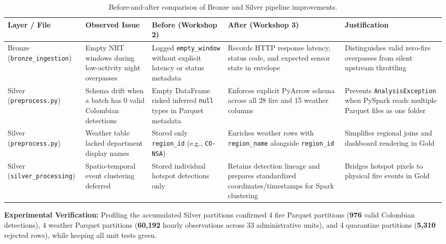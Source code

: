 \documentclass[11pt,letterpaper]{article}
\begin{document}
\begin{table}[H]
  \centering
  \footnotesize
  \setlength{\tabcolsep}{4pt}
  \begin{tabularx}{\textwidth}{>{\raggedright\arraybackslash}p{2.75cm} >{\raggedright\arraybackslash}X >{\raggedright\arraybackslash}X >{\raggedright\arraybackslash}X >{\raggedright\arraybackslash}X}
    \toprule
    \textbf{Layer / File} & \textbf{Observed Issue} & \textbf{Before (Workshop 2)} & \textbf{After (Workshop 3)} & \textbf{Justification} \\
    \midrule
    Bronze (\texttt{bronze\_\-ingestion}) & Empty NRT windows during low-activity night overpasses & Logged \texttt{empty\_window} without explicit latency or status metadata & Records HTTP response latency, status code, and expected sensor state in envelope & Distinguishes valid zero-fire overpasses from silent upstream throttling \\
    \addlinespace
    Silver (\texttt{preprocess.py}) & Schema drift when a batch has 0 valid Colombian detections & Empty DataFrame risked inferred \texttt{null} types in Parquet metadata & Enforces explicit PyArrow schema across all 28 fire and 15 weather columns & Prevents \texttt{AnalysisException} when PySpark reads multiple Parquet files as one folder \\
    \addlinespace
    Silver (\texttt{preprocess.py}) & Weather table lacked department display names & Stored only \texttt{region\_id} (e.g., \texttt{CO-NSA}) & Enriches weather rows with \texttt{region\_name} alongside \texttt{region\_id} & Simplifies regional joins and dashboard rendering in Gold \\
    \addlinespace
    Silver (\texttt{silver\_\-processing}) & Spatio-temporal event clustering deferred & Stored individual hotspot detections only & Retains detection lineage and prepares standardized coordinates/timestamps for Spark clustering & Bridges hotspot pixels to physical fire events in Gold \\
    \bottomrule
  \end{tabularx}
  \caption{Before-and-after comparison of Bronze and Silver pipeline improvements.}
  \label{tab:pipeline_improvements}
\end{table}

\noindent\textbf{Experimental Verification:} Profiling the accumulated Silver partitions confirmed 4 fire Parquet partitions (\textbf{976} valid Colombian detections), 4 weather Parquet partitions (\textbf{60,192} hourly observations across 33 administrative units), and 4 quarantine partitions (\textbf{5,310} rejected rows), while keeping all unit tests green.
\end{document}
